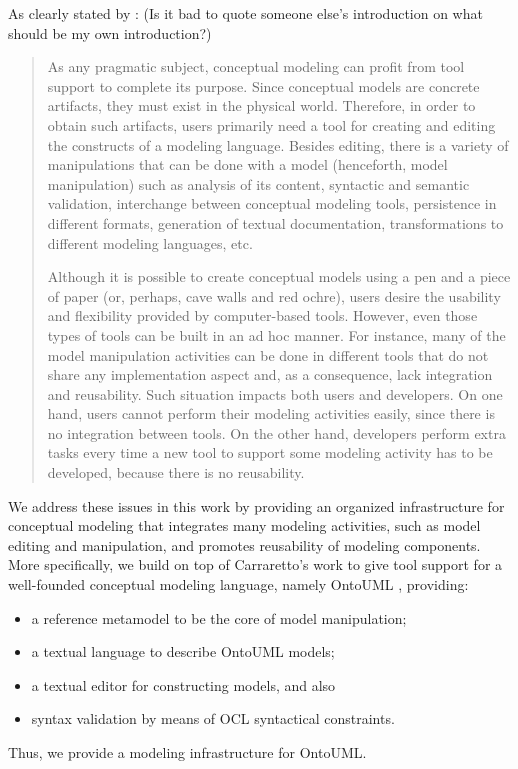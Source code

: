 \documentclass[
	10pt,				%
	oneside,
	a4paper,			%
	brazil,
	english
	]{abntex2}
\begin{document}
As clearly stated by \citeauthor{carraretto10}:
(Is it bad to quote someone else's introduction on what should be my own introduction?)
%
\begin{quotation}
As any pragmatic subject, conceptual modeling can profit from tool support to complete its purpose. Since conceptual models are concrete artifacts, they must exist in the physical world. Therefore, in order to obtain such artifacts, users primarily need a tool for creating and editing the constructs of a modeling language. Besides editing, there is a variety of manipulations that can be done with a model (henceforth, model manipulation) such as analysis of its content, syntactic and semantic validation, interchange between conceptual modeling tools, persistence in different formats, generation of textual documentation, transformations to different modeling languages, etc.

Although it is possible to create conceptual models using a pen and a piece of paper (or, perhaps, cave walls and red ochre), users desire the usability and flexibility provided by computer-based tools. However, even those types of tools can be built in an ad hoc manner. For instance, many of the model manipulation activities can be done in different tools that do not share any implementation aspect and, as a consequence, lack integration and reusability. Such situation impacts both users and developers. On one hand, users cannot perform their modeling activities easily, since there is no integration between tools. On the other hand, developers perform extra tasks every time a new tool to support some modeling activity has to be developed, because there is no reusability.
\end{quotation}

We address these issues in this work by providing an organized infrastructure for conceptual modeling that integrates many modeling activities, such as model editing and manipulation, and promotes reusability of modeling components.
%
More specifically, we
build on top of Carraretto's work \cite{carraretto10} to
give tool support for a well-founded conceptual modeling language, namely OntoUML \cite{guizzardi05}, providing:
\begin{itemize}[nolistsep]{\topsep=0em\partopsep=0em} \tightlist
  \item a reference metamodel to be the core of model manipulation;
  \item a textual language to describe OntoUML models;
  \item a textual editor for constructing models, and also
  \item syntax validation by means of OCL syntactical constraints.
\end{itemize}
%
Thus, we provide a modeling infrastructure for OntoUML.
\end{document}
